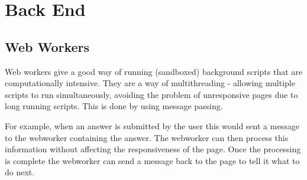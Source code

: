 \section{Back End} 
\label{Section:Back end}
\subsection{Web Workers}
\label{Subsection:WebWorkers}
Web workers give a good way of running (sandboxed) background scripts that are computationally intensive. They are a way of multithreading - allowing multiple scripts to run simultaneously, avoiding the problem of unresponsive pages due to long running scripts. This is done by using message passing. 

For example, when an answer is submitted by the user this would sent a message to the webworker containing the answer. The webworker can then process this information without affecting the responsiveness of the page. Once the processing is complete the webworker can send a message back to the page to tell it what to do next.
